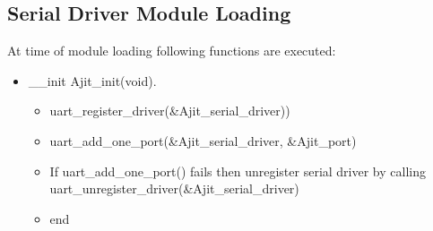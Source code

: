 \documentclass[12pt,a4paper]{article}
\begin{document}
\subsection{Serial Driver Module Loading}
At time of module loading following functions are executed:
\begin{itemize}
\item \_\_init Ajit\_init(void).
\begin{itemize}
\item uart\_register\_driver(\&Ajit\_serial\_driver))
\item uart\_add\_one\_port(\&Ajit\_serial\_driver, \&Ajit\_port)
\item If uart\_add\_one\_port() fails then unregister serial driver by calling \\ uart\_unregister\_driver(\&Ajit\_serial\_driver)
\item end
\end{itemize}
\end{itemize} 
\end{document}
